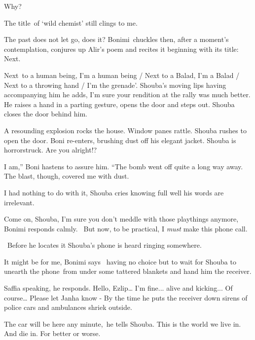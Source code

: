 \documentclass[letterpaper]{article}
\begin{document}
{\textquotedbl}Why?{\textquotedbl}

{\textquotedbl}The title~of `wild chemist' still clings to me.{\textquotedbl} 

{\textquotedbl}The past does not let go, does it?{\textquotedbl} Bonimi~chuckles then, after a moment's contemplation,
conjures up Alir's poem and recites it beginning with its title: {\textquotedbl}Next. 

Next~to a human being, I'm a human being / Next to a Balad, I'm a Balad / Next to a throwing hand / I'm the
grenade'.{\textquotedbl} Shouba's moving lips having accompanying him he adds, {\textquotedbl}I'm sure your rendition
at the rally was much better.{\textquotedbl} He raises a hand in a parting gesture, opens the door and steps out.
Shouba closes the door behind him.

A resounding explosion rocks the house. Window panes rattle. Shouba rushes to open the door. Boni re-enters, brushing
dust off his elegant jacket. Shouba is horrorstruck. {\textquotedbl}Are you alright!?{\textquotedbl} 

{\textquotedbl}I am,'' Boni hastens to assure him. ``The bomb went off quite a long way away. The blast, though, covered
me with dust.{\textquotedbl} 

{\textquotedbl}I had nothing to do with it,{\textquotedbl} Shouba cries knowing full well his words are irrelevant.

{\textquotedbl}Come on, Shouba, I'm sure you don't meddle with those playthings anymore,{\textquotedbl} Bonimi responds
calmly. \ {\textquotedbl}But now, to be practical, I \textit{must }make this phone call.{\textquotedbl}

\ Before he locates it Shouba's phone is heard ringing somewhere. 

{\textquotedbl}It might be for me,{\textquotedbl} Bonimi says \ having no choice but to wait for Shouba to unearth the
phone~from under some tattered{ }blankets and hand him the receiver. 

{\textquotedbl}Saffia speaking,{\textquotedbl} he responds. {\textquotedbl}Hello, Ezlip{\dots} I'm fine... alive and
kicking... Of course{\dots} Please let Janha know -{\textquotedbl} By the time he puts the receiver down sirens of
police cars and ambulances shriek outside. 

{\textquotedbl}The car will be here any minute,{\textquotedbl}~he tells Shouba. {\textquotedbl}This is the world we live
in. And die in. For better or worse.{\textquotedbl}
\end{document}
